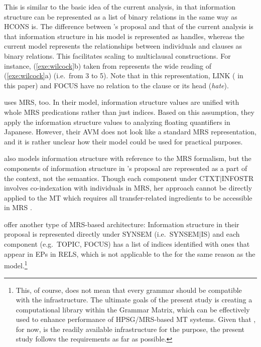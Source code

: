 \noindent This is similar to the basic idea of the current analysis,
in that information structure can be represented as a list of
binary relations in the same way as HCONS is.
The difference between \citeauthor{wilcock:05}'s proposal and that of the current
analysis is that information structure in his model is represented as
handles, whereas the current model represents the relationships
between individuals and clauses as binary relations. This facilitates
scaling to multiclausal constructions. For instance,
(\ref{exe:wilcock}b) taken from \citet[p.\ 275]{wilcock:05} represents
the wide  reading of (\ref{exe:wilcock}a) (i.e.\ from 3 to
5). Note that in this representation, LINK ( in this paper)
and FOCUS have no relation to the clause or its head (\textit{hate}).





\citet{yoshimoto:etal:06} uses MRS, too. In their model,
information structure values are unified with whole MRS predications
rather than just indices. Based on this assumption, they apply the
information structure values to analyzing floating quantifiers in
Japanese.  However, their AVM does not look like a standard MRS
representation, and it is rather unclear how their model could be used
for practical purposes.



\citet{paggio:09} also models information structure with reference to
the MRS formalism, but the components of information structure in
\citeauthor{paggio:09}'s proposal are represented as a part of the
context, not the semantics. Though each component under
CTXT\ensuremath{\mid}INFOSTR involves co-indexation with individuals
in MRS, her approach cannot be directly applied to the \isi{\logon} MT
 which requires all transfer-related ingredients
to be accessible in MRS \citep{oepen:etal:07}.



\citet{bildhauer:cook:10} offer another type of MRS-based
architecture: Information structure in their proposal is
represented directly under SYNSEM (i.e.\ SYNSEM\ensuremath{\mid}IS)
and each component (e.g.\ TOPIC, FOCUS) has a list of indices
identified with ones that appear in EPs in RELS, which is not
applicable to the \isi{\logon}  for the same
reason as the \citet{paggio:09} model.\footnote{This, of course, does
  not mean that every grammar should be compatible with the
  \isi{\logon} infrastructure. The ultimate goals of the present study
  is creating a computational library within the Grammar Matrix, which
  can be effectively used to enhance performance of HPSG/MRS-based MT
  systems. Given that \isi{\logon}, for now, is the readily available
  infrastructure for the purpose, the present study follows the
  requirements as far as possible.}



